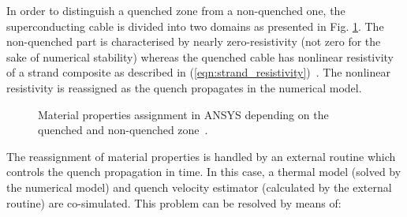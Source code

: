 
In order to distinguish a quenched zone from a non-quenched one, the superconducting cable is divided into two domains as presented in Fig. \ref{fig:ansys_material_assignment}. The non-quenched part is characterised by nearly zero-resistivity (not zero for the sake of numerical stability) whereas the quenched cable has nonlinear resistivity of a strand composite as described in (\ref{eqn:strand_resistivity})~\cite{simon_mcintosh_private_communication}. The nonlinear resistivity is reassigned as the quench propagates in the numerical model.

\begin{figure}[H]
\centering
{}
\caption{Material properties assignment in ANSYS depending on the quenched and non-quenched zone~\cite{simon_mcintosh_private_communication}.}
    \label{fig:ansys_material_assignment}
\end{figure}

The reassignment of material properties is handled by an external routine which controls the quench propagation in time. In this case, a thermal model (solved by the numerical model) and quench velocity estimator (calculated by the external routine) are co-simulated. This problem can be resolved by means of: 

